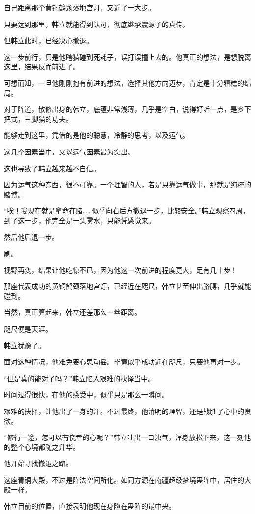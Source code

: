 \begin{this_body}
自己距离那个黄铜鹤颈落地宫灯，又近了一大步。

只要达到那里，韩立就能得到认可，彻底继承震源子的真传。

但韩立此时，已经决心撤退。

这一步前行，只是他瞎猫碰到死耗子，误打误撞上去的。他真正的想法，是想脱离这里，结果反而前进了。

可想而知，一旦他刚刚抱有前进的想法，选择其他方向迈步，肯定是十分糟糕的结局。

对于阵道，散修出身的韩立，底蕴非常浅薄，几乎是空白，说得好听一点，是乡下把式，三脚猫的功夫。

能够走到这里，凭借的是他的聪慧，冷静的思考，以及运气。

这几个因素当中，又以运气因素最为突出。

这也导致了韩立越来越不自信。

因为运气这种东西，很不可靠。一个理智的人，若是只靠运气做事，那就是纯粹的赌博。

“唉！我现在就是拿命在赌……似乎向右后方撤退一步，比较安全。”韩立观察四周，到了这一步，他完全是一头雾水，只能凭感觉来。

然后他后退一步。

刷。

视野再变，结果让他吃惊不已，因为他这一次前进的程度更大，足有几十步！

那座代表成功的黄铜鹤颈落地宫灯，已经近在咫尺，韩立甚至伸出胳膊，几乎就能碰到。

当然，真正算起来，韩立还差那么一丝距离。

咫尺便是天涯。

韩立犹豫了。

面对这种情况，他难免要心思动摇。毕竟似乎成功近在咫尺，只要他再对一步。

“但是真的能对了吗？”韩立陷入艰难的抉择当中。

时间过得很快，在他的感受中，似乎只是那么一瞬间。

艰难的抉择，让他出了一身的汗。不过最终，他清明的理智，还是战胜了心中的贪欲。

“修行一途，怎可以有侥幸的心呢？”韩立吐出一口浊气，浑身放松下来，这一刻他的整个心境都随之升华。

他开始寻找撤退之路。

这座青铜大殿，不过是阵法空间所化。如同方源在南疆超级梦境蛊阵中，居住的大殿一样。

韩立目前的位置，直接表明他现在身陷在蛊阵的最中央。


\end{this_body}
